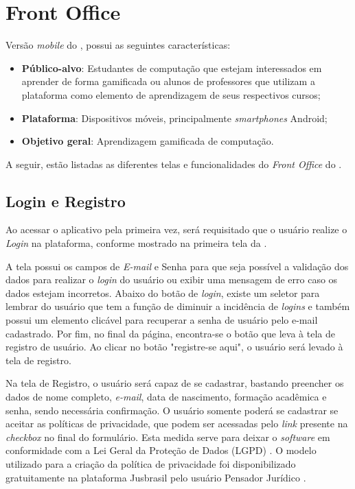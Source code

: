 \section{Front Office}

Versão \textit{mobile} do \appName, possui as seguintes características:

\begin{itemize}
    \item \textbf{Público-alvo}: Estudantes de computação que estejam interessados em aprender de forma gamificada ou alunos de professores que utilizam a plataforma como elemento de aprendizagem de seus respectivos cursos;
    \item \textbf{Plataforma}: Dispositivos móveis, principalmente \textit{smartphones} Android;
    \item \textbf{Objetivo geral}: Aprendizagem gamificada de computação.
\end{itemize}

A seguir, estão listadas as diferentes telas e funcionalidades do \textit{Front Office} do \appName.

\subsection{Login e Registro}

Ao acessar o aplicativo pela primeira vez, será requisitado que o usuário realize o \textit{Login} na plataforma, conforme mostrado na primeira tela da .


A tela possui os campos de \textit{E-mail} e Senha para que seja possível a validação dos dados para realizar o \textit{login} do usuário ou exibir uma mensagem de erro caso os dados estejam incorretos. Abaixo do botão de \textit{login}, existe um seletor para lembrar do usuário que tem a função de diminuir a incidência de \textit{logins} e também possui um elemento clicável para recuperar a senha de usuário pelo e-mail cadastrado. Por fim, no final da página, encontra-se o botão que leva à tela de registro de usuário. Ao clicar no botão "registre-se aqui", o usuário será levado à tela de registro.

Na tela de Registro, o usuário será capaz de se cadastrar, bastando preencher os dados de nome completo, \textit{e-mail}, data de nascimento, formação acadêmica e senha, sendo necessária confirmação. O usuário somente poderá se cadastrar se aceitar as políticas de privacidade, que podem ser acessadas pelo \textit{link} presente na \textit{checkbox} no final do formulário. Esta medida serve para deixar o \textit{software} em conformidade com a Lei Geral da Proteção de Dados (LGPD) \cite{lgpd}. O modelo utilizado para a criação da política de privacidade foi disponibilizado gratuitamente na plataforma Jusbrasil pelo usuário Pensador Jurídico \cite{politica-privacidade}.

